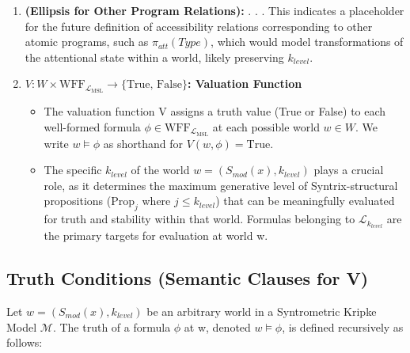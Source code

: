\documentclass[
    12pt,              %
    a4paper,           %
    headings=normal,   %
    twoside=true,      %
    BCOR=8mm,          %
]{scrbook}
\newcommand{\Smodx}{S_{mod}(x)}
\newcommand{\LMSL}{\mathcal{L}_{\text{MSL}}}
\newcommand{\WFFMSL}{\text{WFF}_{\LMSL}}
\newcommand{\Propk}[1]{\text{Prop}_{#1}}
\begin{document}
\begin{enumerate}[label=\arabic*.]
    \item  \textbf{(Ellipsis for Other Program Relations):} . . . This indicates a placeholder for the future definition of accessibility relations corresponding to other atomic programs, such as \(\pi_{att}(Type)\), which would model transformations of the attentional state within a world, likely preserving \(k_{level}\).

    \item  \textbf{\(V: W \times \WFFMSL \rightarrow \{\text{True, False}\}\): Valuation Function}
        \begin{itemize}
            \item   The valuation function V assigns a truth value (True or False) to each well-formed formula \(\phi \in \WFFMSL\) at each possible world \(w \in W\). We write \(w \vDash \phi\) as shorthand for \(V(w, \phi) = \text{True}\).
            \item   The specific \(k_{level}\) of the world \(w = (\Smodx, k_{level})\) plays a crucial role, as it determines the maximum generative level of Syntrix-structural propositions (\(\Propk{j}\) where \(j \le k_{level}\)) that can be meaningfully evaluated for truth and stability within that world. Formulas belonging to \(\mathcal{L}_{k_{level}}\) are the primary targets for evaluation at world w.
        \end{itemize}
\end{enumerate}

\subsection*{Truth Conditions (Semantic Clauses for V)}

Let \(w = (\Smodx, k_{level})\) be an arbitrary world in a Syntrometric Kripke Model \(\mathcal{M}\). The truth of a formula \(\phi\) at w, denoted \(w \vDash \phi\), is defined recursively as follows:
\end{document}
